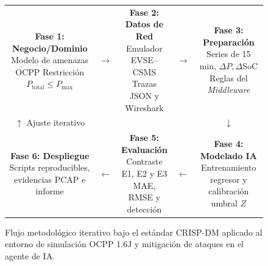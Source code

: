 \documentclass[conference]{IEEEtran}
\begin{document}
\begin{figure}[t]
\centering
\footnotesize
\begin{tabular}{c c c c c}
\fbox{\parbox{3.1cm}{\centering \textbf{Fase 1: Negocio/Dominio}\\Modelo de amenazas OCPP\\Restricción $P_{\text{total}} \le P_{\max}$}}
& $\longrightarrow$ &
\fbox{\parbox{3.1cm}{\centering \textbf{Fase 2: Datos de Red}\\Emulador EVSE--CSMS\\Trazas JSON y Wireshark}}
& $\longrightarrow$ &
\fbox{\parbox{3.1cm}{\centering \textbf{Fase 3: Preparación}\\Series de 15 min, $\Delta P, \Delta \text{SoC}$\\Reglas del \textit{Middleware}}}
\\
$\uparrow$ \scriptsize{Ajuste iterativo} & & & & $\downarrow$ \\
\fbox{\parbox{3.1cm}{\centering \textbf{Fase 6: Despliegue}\\Scripts reproducibles,\\evidencias PCAP e informe}}
& $\longleftarrow$ &
\fbox{\parbox{3.1cm}{\centering \textbf{Fase 5: Evaluación}\\Contraste E1, E2 y E3\\MAE, RMSE y detección}}
& $\longleftarrow$ &
\fbox{\parbox{3.1cm}{\centering \textbf{Fase 4: Modelado IA}\\Entrenamiento regresor\\y calibración umbral $Z$}}
\end{tabular}
\caption{Flujo metodológico iterativo bajo el estándar CRISP-DM aplicado al entorno de simulación OCPP 1.6J y mitigación de ataques en el agente de IA.}
\label{fig:crispdm}
\end{figure}
\end{document}
